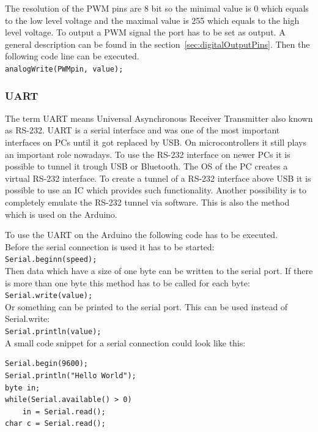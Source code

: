 The resolution of the PWM pins are 8 bit so the minimal value is 0 which equals to the low level voltage and the maximal value is 255 which equals to the high level voltage. 
To output a PWM signal the port has to be set as output. 
A general description can be found in the section~\ref{sec:digitalOutputPins}.
Then the following code line can be executed.\\
\lstinline|analogWrite(PWMpin, value);|



\subsubsection{UART}\label{sec:uart}
The term UART means Universal Asynchronous Receiver Transmitter also known as RS-232.
UART is a serial interface and was one of the most important interfaces on PCs until it got replaced by USB. On microcontrollers it still plays an important role nowadays.
To use the RS-232 interface on newer PCs it is possible to tunnel it trough USB or Bluetooth. 
The OS of the PC creates a virtual RS-232 interface.
To create a tunnel of a RS-232 interface above USB it is possible to use an IC which provides such functionality.
Another possibility is to completely emulate the RS-232 tunnel via software.
This is also the method which is used on the Arduino.

To use the UART on the Arduino the following code has to be executed.\\
Before the serial connection is used it has to be started: \\
\lstinline|Serial.beginn(speed);| \\
Then data which have a size of one byte can be written to the serial port.
If there is more than one byte this method has to be called for each byte: \\
\lstinline|Serial.write(value);| \\
Or something can be printed to the serial port. 
This can be used instead of Serial.write:\\
\lstinline|Serial.println(value);| \\

A small code snippet for a serial connection could look like this:\\
\begin{lstlisting}
Serial.begin(9600);
Serial.println("Hello World");
byte in;
while(Serial.available() > 0)
	in = Serial.read();
char c = Serial.read();
\end{lstlisting}



